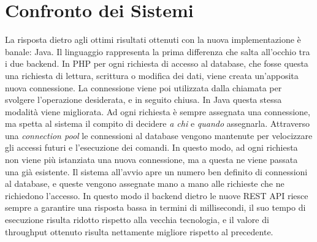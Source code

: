 \section{Confronto dei Sistemi}
La risposta dietro agli ottimi risultati ottenuti con la nuova implementazione è banale: Java. Il linguaggio rappresenta la prima differenza che salta all'occhio tra i due backend. In PHP per ogni richiesta di accesso al database, che fosse questa una richiesta di lettura, scrittura o modifica dei dati, viene creata un'apposita nuova connessione. La connessione viene poi utilizzata dalla chiamata per svolgere l'operazione desiderata, e in seguito chiusa. In Java questa stessa modalità viene migliorata. Ad ogni richiesta è sempre assegnata una connessione, ma spetta al sistema il compito di decidere \emph{a chi} e \emph{quando} assegnarla. Attraverso una \emph{connection pool} le connessioni al database vengono mantenute per velocizzare gli accessi futuri e l'esecuzione dei comandi. In questo modo, ad ogni richiesta non viene più istanziata una nuova connessione, ma a questa ne viene passata una già esistente. Il sistema all'avvio apre un numero ben definito di connessioni al database, e queste vengono assegnate mano a mano alle richieste che ne richiedono l'accesso. In questo modo il backend dietro le nuove REST API riesce sempre a garantire una risposta bassa in termini di millisecondi, il suo tempo di esecuzione risulta ridotto rispetto alla vecchia tecnologia, e il valore di throughput ottenuto risulta nettamente migliore rispetto al precedente.